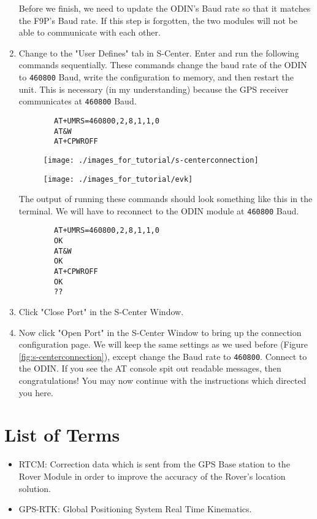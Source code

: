 \documentclass{article}%
\begin{document}
\begin{enumerate}
	Before we finish, we need to update the ODIN's Baud rate so that it matches the F9P's Baud rate.  If this step is forgotten, the two modules will not be able to communicate with each other.
	\item Change to the "User Defines" tab in S-Center.  Enter and run the following commands sequentially.  These commands change the baud rate of the ODIN to \texttt{460800} Baud, write the configuration to memory, and then restart the unit.  This is necessary (in my understanding) because the GPS receiver communicates at \texttt{460800} Baud.
		\begin{lstlisting}
		AT+UMRS=460800,2,8,1,1,0
		AT&W
		AT+CPWROFF
		\end{lstlisting}
		
		
			\begin{figure}
			\centering
			\begin{minipage}{.5\textwidth}
			  \centering
			  \texttt{[image: ./images\_for\_tutorial/s-centerconnection]}
			  \label{fig:s-centerconnection}
			\end{minipage}%
			\begin{minipage}{.5\textwidth}
			  \centering
			  \texttt{[image: ./images\_for\_tutorial/evk]}
			  \label{fig:evk}
			\end{minipage}
			\end{figure}
		
		The output of running these commands should look something like this in the terminal. We will have to reconnect to the ODIN module at \texttt{460800} Baud.
		\begin{lstlisting}
		AT+UMRS=460800,2,8,1,1,0
		OK
		AT&W
		OK
		AT+CPWROFF
		OK
		??
		\end{lstlisting}
	
		\item Click "Close Port" in the S-Center Window.
		\item Now click "Open Port" in the S-Center Window to bring up the connection configuration page.  We will keep the same settings as we used before (Figure \ref{fig:s-centerconnection}), except change the Baud rate to \texttt{460800}.  Connect to the ODIN.  If you see the AT console spit out readable messages, then congratulations! You may now continue with the instructions which directed you here.
	
	\end{enumerate}
	
	\section{List of Terms}

\begin{itemize}
	\item RTCM: Correction data which is sent from the GPS Base station to the Rover Module in order to improve the accuracy of the Rover's location solution.
	\item GPS-RTK: Global Positioning System Real Time Kinematics.
\end{itemize}
\end{document}
